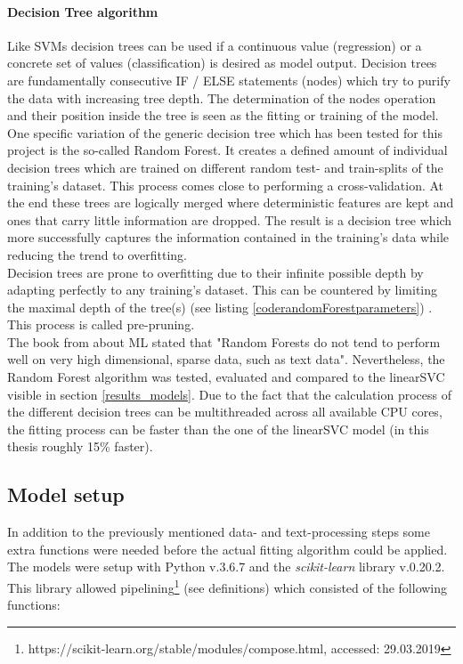 \paragraph*{Decision Tree algorithm}
Like SVMs decision trees can be used if a continuous value (regression) or a concrete set of values (classification) is desired as model output. Decision trees are fundamentally consecutive IF / ELSE statements (nodes) which try to purify the data with increasing tree depth. The determination of the nodes operation and their position inside the tree is seen as the fitting or training of the model.\\
One specific variation of the generic decision tree which has been tested for this project is the so-called Random Forest. It creates a defined amount of individual decision trees which are trained on different random test- and train-splits of the training's dataset. This process comes close to performing a cross-validation. At the end these trees are logically merged where deterministic features are kept and ones that carry little information are dropped. The result is a decision tree which more successfully captures the information contained in the training's data while reducing the trend to overfitting.\\
Decision trees are prone to overfitting due to their infinite possible depth by adapting perfectly to any training's dataset. This can be countered by limiting the maximal depth of the tree(s) (see listing \ref{coderandomForestparameters}) . This process is called pre-pruning.\\
\newline
 The book from \textcite{Guido2016} about ML stated that "Random Forests do not tend to perform well on very high dimensional, sparse data, such as text data". Nevertheless, the Random Forest algorithm was tested, evaluated and compared to the linearSVC visible in section \ref{results_models}. Due to the fact that the calculation process of the different decision trees can be multithreaded across all available CPU cores, the fitting process can be faster than the one of the linearSVC model (in this thesis roughly 15\% faster). 

\subsection{Model setup} \label{model_setup}
In addition to the previously mentioned data- and text-processing steps some extra functions were needed before the actual fitting algorithm could be applied. The models were setup with Python v.3.6.7 and the \textit{scikit-learn} library v.0.20.2. This library allowed pipelining\footnote{https://scikit-learn.org/stable/modules/compose.html, accessed: 29.03.2019} (see definitions) which consisted of the following functions:

